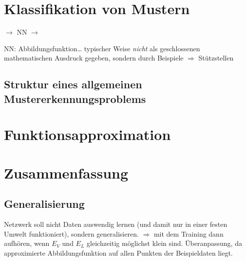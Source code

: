 \section{Klassifikation von Mustern}
\begin{center}
 $\to$ NN $\to$ 
\end{center}
NN: Abbildungsfunktion… typischer Weise \emph{nicht} als geschlossenen mathematischen Ausdruck gegeben, sondern durch Beispiele $\Rightarrow$ Stützstellen
\subsection{Struktur eines allgemeinen Mustererkennungsproblems}

\section{Funktionsapproximation}

\section{Zusammenfassung}
\subsection{Generalisierung}
Netzwerk soll nicht Daten auswendig lernen (und damit nur in einer festen Umwelt funktioniert), sondern generalisieren.
$\Rightarrow$ mit dem Training dann aufhören, wenn $E_V$ und $E_L$ gleichzeitig möglichst klein sind.
Überanpassung, da approximierte Abbildungsfunktion auf allen Punkten der Beispieldaten liegt.



